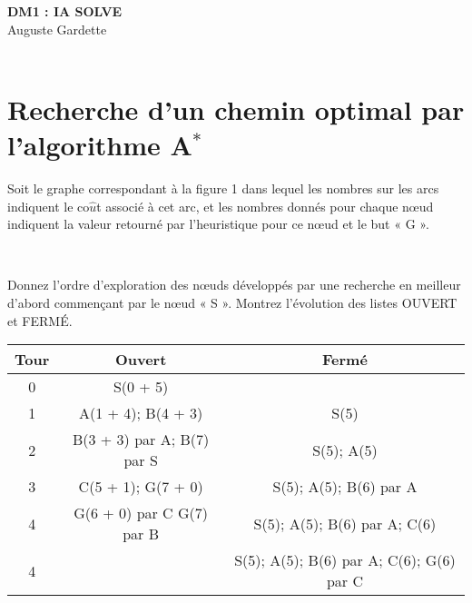 \documentclass[12pt,a4paper, france]{article}
\begin{document}
\begin{center}
{\textbf {\huge DM1 : IA SOLVE}}\\[5mm]
{\large Auguste Gardette} \\[5mm]
{} \\ [5mm]
\end{center}

\section{Recherche d’un chemin optimal par l’algorithme A${^*}$}

Soit le graphe correspondant \`a la figure 1 dans lequel les nombres sur les arcs indiquent le co${\hat{u}}$t
associ\'e \`a cet arc, et les nombres donn\'es pour chaque nœud indiquent la valeur retourn\'e par l\textquoteright heuristique pour ce nœud et le but « G ». \\


\begin{center}
 \\ [5mm]
\end{center}


Donnez l\textquoteright ordre d\textquoteright exploration des nœuds d\'evelopp\'es par une recherche en meilleur d\textquoteright abord commençant par le nœud  « S ». Montrez l\textquoteright \'evolution des listes OUVERT et FERM\'E. \\

\begin{tabular}{ | c || *{2}{c|}}
    \hline
    Tour & Ouvert & Ferm\'e  \\
    \hline
    \hline
    0 & S(0 + 5) & \\
    \hline
    1 & A(1 + 4); B(4 + 3) & S(5)\\
    \hline
    2 & B(3 + 3) par A; B(7) par S & S(5); A(5)\\
    \hline
    3 & C(5 + 1); G(7 + 0) & S(5); A(5); B(6) par A \\
    \hline
    4 & G(6 + 0) par C G(7) par B & S(5); A(5); B(6) par A; C(6)\\
    \hline
    4 & & S(5); A(5); B(6) par A; C(6); G(6) par C\\
    \hline
\end{tabular} \\
\end{document}
